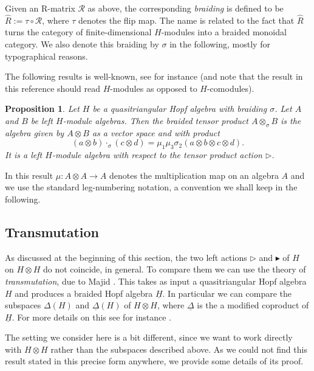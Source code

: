 \documentclass[a4paper, 12pt, reqno, english]{amsart}
\numberwithin{equation}{section}
\numberwithin{figure}{section}
\theoremstyle{plain}
\theoremstyle{plain}
\theoremstyle{plain}
\newtheorem{proposition}[theorem]{Proposition}
\theoremstyle{plain}
\theoremstyle{plain}
\theoremstyle{definition}
\theoremstyle{definition}
\theoremstyle{definition}
\theoremstyle{remark}
\theoremstyle{definition}
\theoremstyle{definition}
\newcommand{\calR}{\mathcal{R}}
\begin{document}
Given an R-matrix $\calR$ as above, the corresponding \emph{braiding} is defined to be $\hat{R} := \tau \circ \calR$, where $\tau$ denotes the flip map.
The name is related to the fact that $\hat{R}$ turns the category of finite-dimensional $H$-modules into a braided monoidal category.
We also denote this braiding by $\sigma$ in the following, mostly for typographical reasons.

The following results is well-known, see for instance \cite[Corollary 9.2.13]{majid-book} (and note that the result in this reference should read $H$-modules as opposed to $H$-comodules).

\begin{proposition}
\label{prop:braided-product}
Let $H$ be a quasitriangular Hopf algebra with braiding $\sigma$.
Let $A$ and $B$ be left $H$-module algebras.
Then the \emph{braided tensor product} $A \otimes_\sigma B$ is the algebra given by $A \otimes B$ as a vector space and with product
\[
(a \otimes b) \cdot_\sigma (c \otimes d) = \mu_1 \mu_3 \sigma_2 (a \otimes b \otimes c \otimes d).
\]
It is a left $H$-module algebra with respect to the tensor product action $\triangleright$.
\end{proposition}

In this result $\mu: A \otimes A \to A$ denotes the multiplication map on an algebra $A$ and we use the standard leg-numbering notation, a convention we shall keep in the following.

\subsection{Transmutation}

As discussed at the beginning of this section, the two left actions $\triangleright$ and $\blacktriangleright$ of $H$ on $H \otimes H$ do not coincide, in general.
To compare them we can use the theory of \emph{transmutation}, due to Majid \cite{majid-transmutation, majid-braided}.
This takes as input a quasitriangular Hopf algebra $H$ and produces a braided Hopf algebra $\underline{H}$.
In particular we can compare the subspaces $\Delta(H)$ and $\underline{\Delta}(H)$ of $H \otimes H$, where $\underline{\Delta}$ is the a modified coproduct of $\underline{H}$.
For more details on this see for instance \cite[Theorem 7.4.2 and Example 9.4.9]{majid-book}.

The setting we consider here is a bit different, since we want to work directly with $H \otimes H$ rather than the subspaces described above.
As we could not find this result stated in this precise form anywhere, we provide some details of its proof.
\end{document}
